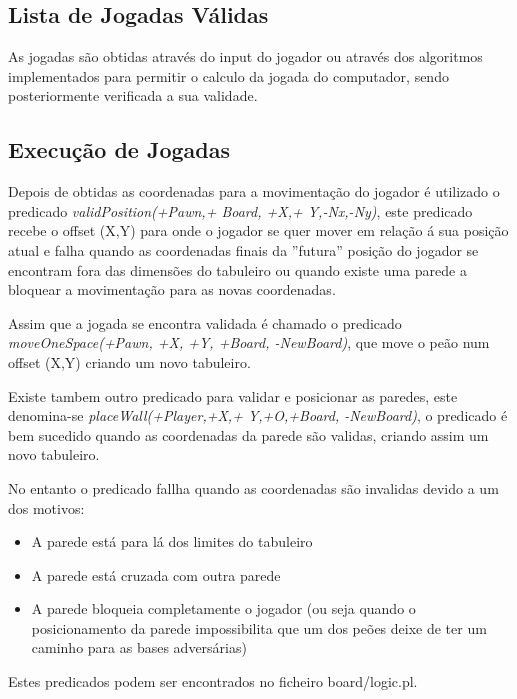 \documentclass[a4paper]{article}
\begin{document}
\subsection{Lista de Jogadas Válidas} 

As jogadas são obtidas através do input do jogador ou através dos algoritmos implementados para permitir o calculo da jogada do computador, sendo posteriormente verificada a sua validade.

\newpage
\subsection{Execução de Jogadas} 

Depois de obtidas as coordenadas para a movimentação do jogador é utilizado o predicado \textit{validPosition(+Pawn,+ Board, +X,+ Y,-Nx,-Ny)}, este predicado recebe o offset (X,Y) para onde o jogador se quer mover em relação á sua posição atual e falha quando as coordenadas finais da ''futura'' posição do jogador se encontram fora das dimensões do tabuleiro ou quando existe uma parede a bloquear a movimentação para as novas coordenadas.
\par Assim que a jogada se encontra validada é chamado o predicado \textit{moveOneSpace(+Pawn, +X, +Y, +Board, -NewBoard)}, que move o peão num offset (X,Y) criando um novo tabuleiro.
\par Existe tambem outro predicado para validar e posicionar as paredes, este denomina-se \textit{placeWall(+Player,+X,+ Y,+O,+Board, -NewBoard)},  o predicado é bem sucedido quando as coordenadas da parede são validas, criando assim um novo tabuleiro.
\par No entanto o predicado fallha quando as coordenadas são invalidas devido a um dos motivos:
\begin{itemize}
	\item A parede está para lá dos limites do tabuleiro
	\item A parede está cruzada com outra parede
	\item A parede bloqueia completamente o jogador (ou seja quando o posicionamento da parede impossibilita que um dos peões deixe de ter um caminho para as bases adversárias)
\end{itemize}

Estes predicados podem ser encontrados no ficheiro board/logic.pl.
\end{document}
